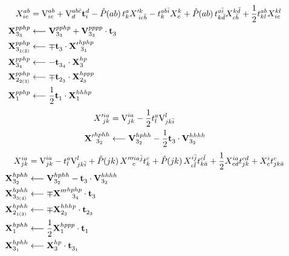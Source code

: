 \documentclass[thesis.tex]{subfiles}
\begin{document}
\begin{align}
  X^{ab}_{\hspace{0.3pt} ic} &= \text{V}^{ab}_{ic} + \text{V}^{ab\bar{c}}_{d}\mathbf{t}^{d}_{i} - \mathop{\hat{P}\hspace{-2pt}\left( ab\right) }t^{a}_{k}X'^{k}_{\hspace{2.3pt} ic\bar{b}} - t^{ab\bar{i}}_{k}X^{k}_{\hspace{0.3pt} c} + \mathop{\hat{P}\hspace{-2pt}\left( ab\right) }t^{a\bar{i}}_{k\bar{d}}X^{k\bar{d}}_{\hspace{0.3pt} c\bar{b}} + \frac{1}{2}t^{ab}_{kl}X^{kl}_{\hspace{0.3pt} ic} \notag \\
  \mathbf{X}^{pphp}_{\hspace{0.3pt} 3_{3}} &\longleftarrow \text{\textbf{V}}^{pphp}_{3_{3}} + \text{\textbf{V}}^{pppp}_{3_{3}}\cdot\mathbf{t}^{}_{3} \notag \\
  \mathbf{X}^{pphp}_{\hspace{0.3pt} 3_{1(2)}} &\longleftarrow \mp\mathbf{t}^{}_{3}\cdot\mathbf{X'}^{hphp}_{\hspace{2.3pt} 3_{1}} \notag \\
  \mathbf{X}^{pphp}_{\hspace{0.3pt} 3_{4}} &\longleftarrow -\mathbf{t}^{}_{3_{4}}\cdot\mathbf{X}^{hp}_{\hspace{0.3pt} 3} \notag \\
  \mathbf{X}^{pphp}_{\hspace{0.3pt} 2_{2(3)}} &\longleftarrow \mp\mathbf{t}^{}_{2_{3}}\cdot\mathbf{X}^{hppp}_{\hspace{0.3pt} 2_{3}} \notag \\
  \mathbf{X}^{pphp}_{\hspace{0.3pt} 1} &\longleftarrow \frac{1}{2}\mathbf{t}^{}_{1}\cdot\mathbf{X}^{hhhp}_{\hspace{0.3pt} 1}
\end{align}
\begin{align}
  X'^{ia}_{\hspace{2.3pt} jk} &= \text{V}^{ia}_{jk} - \frac{1}{2}t^{a}_{l}\text{V}^{l}_{jk\bar{i}} \notag \\
  \mathbf{X'}^{hphh}_{\hspace{2.3pt} 3_{2}} &\longleftarrow \text{\textbf{V}}^{hphh}_{3_{2}} - \frac{1}{2}\mathbf{t}^{}_{3}\cdot\text{\textbf{V}}^{hhhh}_{3_{2}}
\end{align}
\begin{align}
  X^{ia}_{\hspace{0.3pt} jk} &= \text{V}^{ia}_{jk} - t^{a}_{l}\text{V}^{l}_{jk\bar{i}} + \mathop{\hat{P}\hspace{-2pt}\left( jk\right) }X'''^{ia\bar{j}}_{\hspace{6.3pt} c}t^{c}_{k} + \mathop{\hat{P}\hspace{-2pt}\left( jk\right) }X^{i\bar{j}}_{\hspace{0.3pt} c\bar{l}}t^{c\bar{l}}_{k\bar{a}} + \frac{1}{2}X^{ia}_{\hspace{0.3pt} cd}t^{cd}_{jk} + X^{i}_{\hspace{0.3pt} c}t^{c}_{jk\bar{a}} \notag \\
  \mathbf{X}^{hphh}_{\hspace{0.3pt} 3_{2}} &\longleftarrow \text{\textbf{V}}^{hphh}_{3_{2}} - \mathbf{t}^{}_{3}\cdot\text{\textbf{V}}^{hhhh}_{3_{2}} \notag \\
  \mathbf{X}^{hphh}_{\hspace{0.3pt} 3_{3(4)}} &\longleftarrow \mp\mathbf{X'''}^{hphp}_{\hspace{6.3pt} 3_{4}}\cdot\mathbf{t}^{}_{3} \notag \\
  \mathbf{X}^{hphh}_{\hspace{0.3pt} 2_{1(3)}} &\longleftarrow \mp\mathbf{X}^{hhhp}_{\hspace{0.3pt} 2_{3}}\cdot\mathbf{t}^{}_{2_{3}} \notag \\
  \mathbf{X}^{hphh}_{\hspace{0.3pt} 1} &\longleftarrow \frac{1}{2}\mathbf{X}^{hppp}_{\hspace{0.3pt} 1}\cdot\mathbf{t}^{}_{1} \notag \\
  \mathbf{X}^{hphh}_{\hspace{0.3pt} 3_{1}} &\longleftarrow \mathbf{X}^{hp}_{\hspace{0.3pt} 3}\cdot\mathbf{t}^{}_{3_{1}}  
\end{align}
\end{document}
